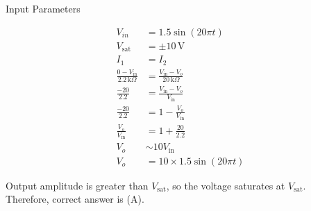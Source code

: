 \documentclass[journal,12pt,twocolumn]{IEEEtran}
\begin{document}
\begin{table}
  \centering
  
  
  \caption{Input Parameters}
  \label{tab:PH.11.table1}
\end{table}
\begin{align}
V_{in} &= 1.5 \sin(20\pi t)\\
V_{\text{sat}} &= \pm 10 \, \text{V}\\
I_1 &= I_2\\
\frac{0 - V_{\text{in}}}{2.2 \, \text{k}\Omega} &= \frac{V_{\text{in}} - V_o}{20 \, \text{k}\Omega}\\
\frac{-20}{2.2} &= \frac{V_{\text{in}} - V_o}{V_{\text{in}}}\\
\frac{-20}{2.2} &= 1 - \frac{V_o}{V_{\text{in}}}\\
\frac{V_o}{V_{\text{in}}} &= 1 + \frac{20}{2.2}\\
V_o &\sim 10 V_{\text{in}}\\
V_o &= 10 \times 1.5 \sin(20\pi t)
\end{align}

Output amplitude is greater than $V_{\text{sat}}$, so the voltage saturates at $V_{\text{sat}}$.\\
Therefore, correct answer is (A).
\end{document}
